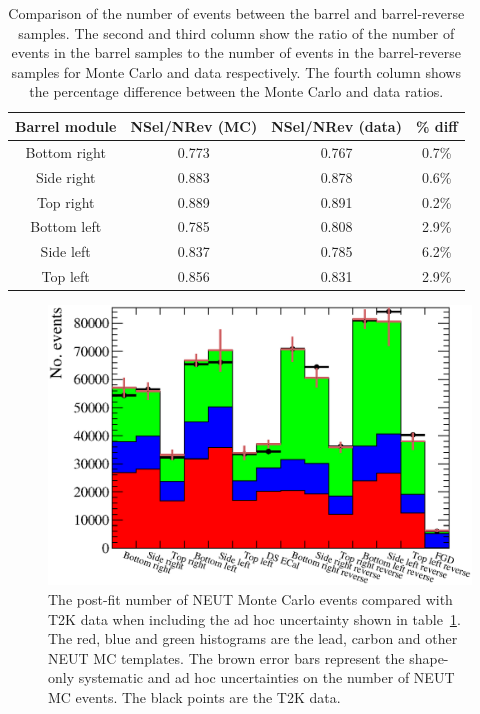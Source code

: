 \begin{table}
  \begin{tabular}{c c c c }
    Barrel module & NSel/NRev (MC) & NSel/NRev (data) & \% diff \\ \hline \hline
    Bottom right & 0.773 & 0.767 & 0.7\% \\
    Side right & 0.883 & 0.878 & 0.6\% \\
    Top right & 0.889 & 0.891 & 0.2\% \\
    Bottom left & 0.785 & 0.808 & 2.9\% \\
    Side left & 0.837 & 0.785 & 6.2\% \\
    Top left & 0.856 & 0.831 & 2.9\% \\
  \end{tabular}
  \caption{Comparison of the number of events between the barrel and barrel-reverse samples.  The second and third column show the ratio of the number of events in the barrel samples to the number of events in the barrel-reverse samples for Monte Carlo and data respectively.  The fourth column shows the percentage difference between the Monte Carlo and data ratios.}
  \label{table:NSelToNRevRatio}
\end{table}
\begin{figure}
  \centering
  \includegraphics[width=15cm]{images/measurement/data/MCTemplatesWithSystematics_T2KData_PostFit_WithErrorFudge.eps}
  \caption{The post-fit number of NEUT Monte Carlo events compared with T2K data when including the ad hoc uncertainty shown in table~\ref{table:NSelToNRevRatio}.  The red, blue and green histograms are the lead, carbon and other NEUT MC templates.  The brown error bars represent the shape-only systematic and ad hoc uncertainties on the number of NEUT MC events.  The black points are the T2K data.}
  \label{fig:MCTemplatesWithSystematicsT2KDataPostFitWithFudge}
\end{figure}
